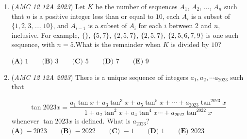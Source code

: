 \begin{enumerate}
 \[(1+2a)(2+2b)(2a+b) = 32ab?\]
$\textbf{(A) }0\qquad\textbf{(B) }1\qquad\textbf{(C) }2\qquad\textbf{(D) }3\qquad\textbf{(E) }\text{an infinite number}$


	\item (\textit{AMC 12 12A 2023}) Let $K$ be the number of sequences $A_1$, $A_2$, $\dots$, $A_n$ such that $n$ is a positive integer less than or equal to $10$, each $A_i$ is a subset of $\{1, 2, 3, \dots, 10\}$, and $A_{i-1}$ is a subset of $A_i$ for each $i$ between $2$ and $n$, inclusive. For example, $\{\}$, $\{5, 7\}$, $\{2, 5, 7\}$, $\{2, 5, 7\}$, $\{2, 5, 6, 7, 9\}$ is one such sequence, with $n = 5$.What is the remainder when $K$ is divided by $10$?


 $\textbf{(A) } 1 \qquad \textbf{(B) } 3 \qquad \textbf{(C) } 5 \qquad \textbf{(D) } 7 \qquad \textbf{(E) } 9$


	\item (\textit{AMC 12 12A 2023}) There is a unique sequence of integers $a_1, a_2, \cdots a_{2023}$ such that

 \[\tan2023x = \frac{a_1 \tan x + a_3 \tan^3 x + a_5 \tan^5 x + \cdots + a_{2023} \tan^{2023} x}{1 + a_2 \tan^2 x + a_4 \tan^4 x \cdots + a_{2022} \tan^{2022} x}\]whenever $\tan 2023x$ is defined. What is $a_{2023}?$
$\textbf{(A) } -2023 \qquad\textbf{(B) } -2022 \qquad\textbf{(C) } -1 \qquad\textbf{(D) } 1 \qquad\textbf{(E) } 2023$


\end{enumerate}